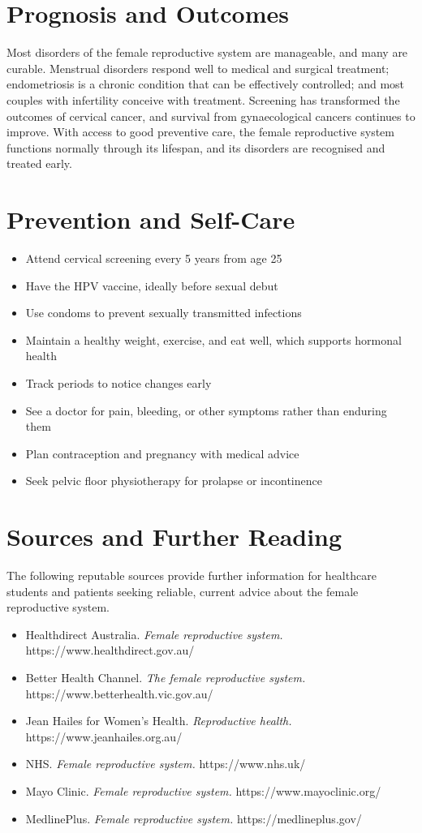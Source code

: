 \section*{Prognosis and Outcomes}
Most disorders of the female reproductive system are manageable, and many are curable. Menstrual disorders respond well to medical and surgical treatment; endometriosis is a chronic condition that can be effectively controlled; and most couples with infertility conceive with treatment. Screening has transformed the outcomes of cervical cancer, and survival from gynaecological cancers continues to improve. With access to good preventive care, the female reproductive system functions normally through its lifespan, and its disorders are recognised and treated early.

\section*{Prevention and Self-Care}
\begin{itemize}
    \item Attend cervical screening every 5 years from age 25
    \item Have the HPV vaccine, ideally before sexual debut
    \item Use condoms to prevent sexually transmitted infections
    \item Maintain a healthy weight, exercise, and eat well, which supports hormonal health
    \item Track periods to notice changes early
    \item See a doctor for pain, bleeding, or other symptoms rather than enduring them
    \item Plan contraception and pregnancy with medical advice
    \item Seek pelvic floor physiotherapy for prolapse or incontinence
\end{itemize}

\section*{Sources and Further Reading}
The following reputable sources provide further information for healthcare students and patients seeking reliable, current advice about the female reproductive system.
\begin{itemize}
    \item Healthdirect Australia. \textit{Female reproductive system.} https://www.healthdirect.gov.au/
    \item Better Health Channel. \textit{The female reproductive system.} https://www.betterhealth.vic.gov.au/
    \item Jean Hailes for Women's Health. \textit{Reproductive health.} https://www.jeanhailes.org.au/
    \item NHS. \textit{Female reproductive system.} https://www.nhs.uk/
    \item Mayo Clinic. \textit{Female reproductive system.} https://www.mayoclinic.org/
    \item MedlinePlus. \textit{Female reproductive system.} https://medlineplus.gov/
\end{itemize}
